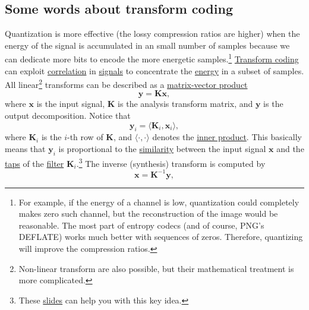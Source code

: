 \subsection{Some words about transform coding}
Quantization is more effective (the lossy compression ratios are
higher) when the energy of the signal is accumulated in an small
number of samples because we can dedicate more bits to encode the more
energetic samples.\footnote{For example, if the energy of a channel is
low, quantization could completely makes zero such channel, but the
reconstruction of the image would be reasonable. The most part of
entropy codecs (and of course, PNG's DEFLATE) works much better with
sequences of zeros. Therefore, quantizing will improve the compression
ratios.}
\href{https://web.stanford.edu/class/ee398a/handouts/lectures/07-TransformCoding.pdf}{Transform
  coding} can exploit
\href{https://en.wikipedia.org/wiki/Correlation_and_dependence}{correlation}
in \href{https://en.wikipedia.org/wiki/Signal}{signals} to concentrate
the
\href{https://en.wikipedia.org/wiki/Energy_(signal_processing)}{energy}
in a subset of samples.  All linear\footnote{Non-linear transform are
also possible, but their mathematical treatment is more complicated.}
transforms can be described as a
\href{https://en.wikipedia.org/wiki/Matrix_multiplication}{matrix-vector
  product}~\cite{strang4linear}
\begin{equation}
  \mathbf{y} = \mathbf{K}\mathbf{x},
  \label{eq:forward_transform_matrix_form}
\end{equation}
where $\mathbf{x}$ is the input signal, $\mathbf{K}$ is the analysis
transform matrix, and $\mathbf{y}$ is the output decomposition. Notice
that
\begin{equation}
  {\mathbf{y}}_i = \langle {\mathbf{K}}_i, {\mathbf{x}}_i\rangle,
\end{equation}
where ${\mathbf{K}}_i$ is the $i$-th row of $\mathbf{K}$, and
$\langle\cdot,\cdot\rangle$ denotes the
\href{https://mathworld.wolfram.com/InnerProduct.html}{inner
  product}. This basically means that ${\mathbf{y}}_i$ is proportional to the
\href{https://en.wikipedia.org/wiki/Similarity_(geometry)}{similarity}
between the input signal $\mathbf{x}$ and the
\href{https://en.wikipedia.org/wiki/Finite_impulse_response}{taps} of
the \href{https://en.wikipedia.org/wiki/Digital_filter}{filter}
${\mathbf{K}}_i$.\footnote{These
\href{https://cseweb.ucsd.edu/classes/fa17/cse166-a/lec13.pdf}{slides}
can help you with this key idea.} The inverse (synthesis) transform is
computed by
\begin{equation}
  \mathbf{x} = {\mathbf{K}}^{-1}\mathbf{y},
  \label{eq:backward_transform_matrix_form}
\end{equation}
